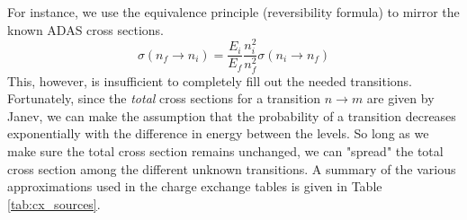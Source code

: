 For instance, we use the equivalence principle (reversibility formula) to mirror the known ADAS cross sections.
\begin{equation}\label{eq:equilvalence}
    \sigma(n_f \rightarrow n_i) = \frac{E_i}{E_f}\frac{n_i^2}{n_f^2}\sigma(n_i \rightarrow n_f)
\end{equation}
This, however, is insufficient to completely fill out the needed transitions.
Fortunately, since the \textit{total} cross sections for a transition $n \rightarrow m$ are given by Janev\cite{janev2003collision}, we can make the assumption that the probability of a transition decreases exponentially with the difference in energy between the levels. So long as we make sure the total cross section remains unchanged, we can "spread" the total cross section among the different unknown transitions.
A summary of the various approximations used in the charge exchange tables is given in Table \ref{tab:cx_sources}.
